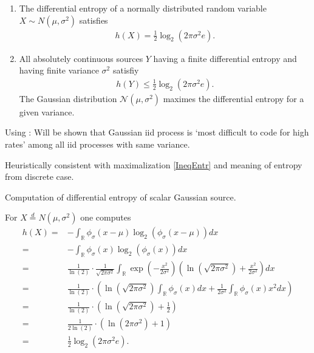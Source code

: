 \begin{frame}
\begin{proposition}
\begin{enumerate}
\item The differential entropy of a normally distributed random variable $X\sim N(\mu,\sigma^2)$ satisfies
\begin{align}\label{EqDiffEntrGV}
h(X)= \frac{1}{2}\log_2(2\pi\sigma^2 e).
\end{align}
\item All absolutely continuous sources $Y$ having a finite differential entropy and having finite variance $\sigma^2$ satisfiy
\begin{align}\label{IneqEntr}
h(Y)\leq \frac{1}{2}\log_2(2\pi\sigma^2 e).
\end{align}
The Gaussian distribution $\mathcal{N}(\mu,\sigma^2)$ maximes the differential entropy for a given variance. 
\end{enumerate}
\end{proposition}
\bit
\item Using : Will be shown that Gaussian iid process is `most difficult to code for high rates' among 
all iid processes with same variance.
\item [\iarrow] Heuristically consistent with maximalization \eqref{IneqEntr} and meaning of entropy from discrete case.  
\eit

\end{frame}

\begin{frame}{Computation of differential entropy of scalar Gaussian source.}
\bit
\item For $X\stackrel{d}{=} N(\mu,\sigma^2)$ one computes
\begin{align*}
h(X)=&-\int_{\mathbb{R}}\phi_{\sigma}(x-\mu)\log_2(\phi_{\sigma}(x-\mu))dx\\
=&-\int_{\mathbb{R}}\phi_{\sigma}(x)\log_2(\phi_{\sigma}(x))dx\\
=& \frac{1}{\ln(2)}\cdot\frac{1}{\sqrt{2\pi\sigma^2}}\int_{\mathbb{R}}\exp\left(-\frac{x^2}{2\sigma^2}\right)\left(\ln(\sqrt{2\pi\sigma^2})+\frac{x^2}{2\sigma^2}\right)dx\\
=&\frac{1}{\ln(2)}\cdot\left(\ln(\sqrt{2\pi\sigma^2})\int_{\mathbb{R}}\phi_\sigma(x)dx+\frac{1}{2\sigma^2}\int_{\mathbb{R}}\phi_\sigma(x)x^2dx\right)\\
=&\frac{1}{\ln(2)}\cdot\left(\ln(\sqrt{2\pi\sigma^2})+\frac{1}{2}\right)\\
=&\frac{1}{2\ln(2)}\cdot\left(\ln(2\pi\sigma^2)+1\right)\\ 
=&\frac{1}{2}\log_2(2\pi\sigma^2 e).
\end{align*}
\eit
\end{frame} 

